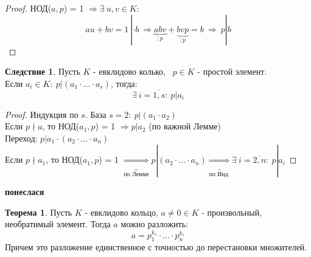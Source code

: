 \documentclass[a4paper, 12pt]{article}
\theoremstyle{definition}
\newtheorem*{theorem}{Теорема}
\newtheorem*{consequense}{Следствие}
\begin{document}
  \begin{proof}
    НОД($a,p$) = 1 $\Longrightarrow \exists \ u, v \in K:$ 
    $$ au+bv = 1 \ | \cdot b \ \Longrightarrow \underbrace{abv}_{\vdots \ p} +\underbrace{bvp}_{\vdots \ p}  = b  \ \Longrightarrow \ p|b$$ 
  \end{proof}
  \begin{consequense}
    Пусть $K$ - евклидово колько, \ $p \in K$ - простой элемент.\\
    Если $a_i \in K: \ p|(a_1\cdot ... \cdot a_s)$, тогда:
    $$\exists \ i = \overline{1, s}: \ p|a_i$$  
  \end{consequense}
  \begin{proof}
    Индукция по $s$. База $s=2: \ p|(a_1 \cdot a_2)$ \\
    Если $p\nmid a$, то НОД($a_1,p$) = 1 $\Longrightarrow p | a_2$ (по важной Лемме)\\
    Переход: $p|a_1 \cdot (a_2\cdot ... \cdot a_n)$\\
    Если $p \nmid a_1$, то НОД($a_1,p$) = 1 $\underbrace{\Longrightarrow}_{\text{по Лемме}} p|(a_2\cdot ... \cdot a_n) \underbrace{\Longrightarrow}_{\text{по Инд.}}  \exists \ i = \overline{2, n}: \ p|a_i$  
  \end{proof} 
    \textbf{понеслася} 
  \begin{theorem}
    Пусть $K$ - евклидово кольцо, $a\neq 0 \in K$ - произвольный, необратимый элемент. Тогда $a$ можно разложить:
    $$a = p_1^{k_s}\cdot ...\cdot p_n^{k_s}$$
    Причем это разложение единственное с точностью до перестановки множителей.   
  \end{theorem}
\end{document}
